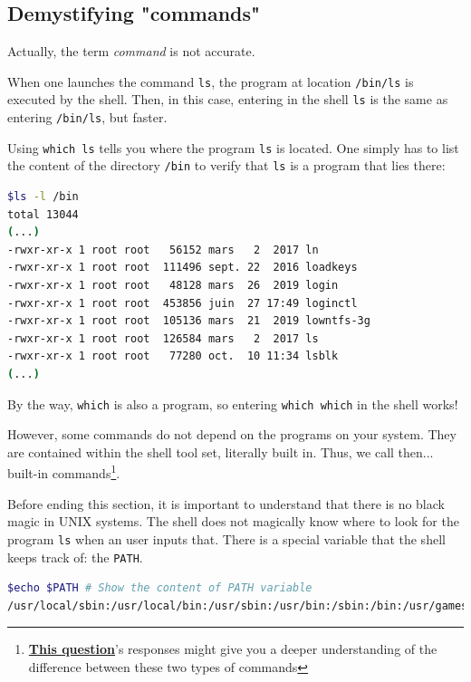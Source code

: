 \documentclass[12pt]{article}
\let\oldhref\href
\renewcommand{\href}[2]{\oldhref{#1}{\bfseries#2}}
\begin{document}
\subsection{Demystifying "commands"} \label{demystifying_commands}

Actually, the term \textit{command} is not accurate.

When one launches the command \texttt{ls}, the program at location \texttt{/bin/ls} is executed by the shell. Then, in this case, entering in the shell \texttt{ls} is the same as entering \texttt{/bin/ls}, but faster.

Using \texttt{which ls} tells you where the program \texttt{ls} is located.
One simply has to list the content of the directory \texttt{/bin} to verify that \texttt{ls} is a program that lies there:

\begin{lstlisting}[language=bash]
$ls -l /bin
total 13044
(...)
-rwxr-xr-x 1 root root   56152 mars   2  2017 ln
-rwxr-xr-x 1 root root  111496 sept. 22  2016 loadkeys
-rwxr-xr-x 1 root root   48128 mars  26  2019 login
-rwxr-xr-x 1 root root  453856 juin  27 17:49 loginctl
-rwxr-xr-x 1 root root  105136 mars  21  2019 lowntfs-3g
-rwxr-xr-x 1 root root  126584 mars   2  2017 ls
-rwxr-xr-x 1 root root   77280 oct.  10 11:34 lsblk
(...)
\end{lstlisting}

By the way, \texttt{which} is also a program, so entering \texttt{which which} in the shell works!

However, some commands do not depend on the programs on your system. They are contained within the shell tool set, literally built in. Thus, we call then... built-in commands\footnote{\href{https://unix.stackexchange.com/questions/11454/what-is-the-difference-between-a-builtin-command-and-one-that-is-not}{This question}'s responses might give you a deeper understanding of the difference between these two types of commands}.

Before ending this section, it is important to understand that there is no black magic in UNIX systems. The shell does not magically know where to look for the program \texttt{ls} when an user inputs that. There is a special variable that the shell keeps track of: the \texttt{PATH}.

\begin{lstlisting}[language=bash]
$echo $PATH # Show the content of PATH variable
/usr/local/sbin:/usr/local/bin:/usr/sbin:/usr/bin:/sbin:/bin:/usr/games:/usr/local/games
\end{lstlisting}
\end{document}

